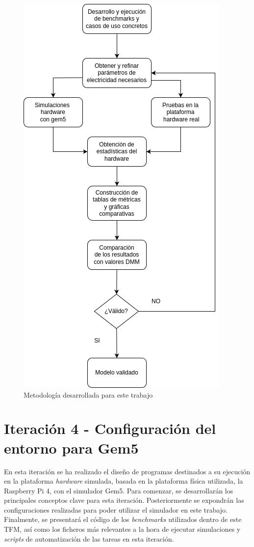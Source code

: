 \begin{figure}[H]
    \centering
    \includegraphics[width=0.65\linewidth, height=1.15\textwidth]{figs/Metodologia_TFM.png}
    \caption{Metodología desarrollada para este trabajo}
    \label{fig:pasos_metodologia}
\end{figure}

\section{Iteración 4 - Configuración del entorno para Gem5}

En esta iteración se ha realizado el diseño de programas destinados a su ejecución en la plataforma \textit{hardware} simulada, basada en la plataforma física utilizada, la Raspberry Pi 4, con el simulador Gem5. Para comenzar, se desarrollarán los principales conceptos clave para esta iteración. Posteriormente se expondrán las configuraciones realizadas para poder utilizar el simulador en este trabajo.
Finalmente, se presentará el código de los \textit{benchmarks} utilizados dentro de este \ac{TFM}, así como los ficheros más relevantes a la hora de ejecutar simulaciones y \textit{scripts} de automatización de las tareas en esta iteración.

